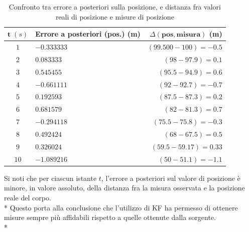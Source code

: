 \begin{table}[h]
	\begin{tabular}{|c|l|r|}
		\hline 
		$\mathbf{t}\;(s)$ & \textbf{Errore a posteriori (pos.) (m)} & $\Delta \mathbf{(pos,misura)}$ \textbf{(m)} \\ 
		\hline 
		$1$ & $-0.333333$ & $(99.500 - 100) =-0.5$ \\ 
		\hline 
		$2$ & $0.083333$ & $(98 - 97.9) = 0.1$ \\ 
		\hline 
		$3$ & $0.545455$ & $(95.5-94.9) = 0.6$ \\ 
		\hline 
		$4$ & $-0.661111$ & $(92 - 92.7) = -0.7$ \\ 
		\hline 
		$5$ &  $0.192593$ & $(87.5 - 87.3) = 0.2$ \\ 
		\hline 
		$6$ & $0.681579$ & $(82 - 81.3) = 0.7$ \\ 
		\hline 
		$7$ & $-0.294118$ & $(75.5 - 75.8) = -0.3$ \\ 
		\hline 
		$8$ & $0.492424$ & $(68 - 67.5) = 0.5$ \\ 
		\hline 
		$9$ & $0.326024$ & $(59.5 - 59.17) = 0.33$ \\ 
		\hline 
		$10$ & $-1.089216$ & $(50-51.1) = -1.1$ \\ 
		\hline 
	\end{tabular} 
	\caption{Confronto tra errore a posteriori sulla posizione, e distanza fra valori reali di posizione e misure di posizione}
	\label{tab:errorsmeas}
\end{table}
Si noti che per ciascun istante $t$, l'errore a posteriori sul valore di posizione \`e minore, in valore assoluto, della distanza fra la misura osservata e la posizione reale del corpo.\\*
Questo porta alla conclusione che l'utilizzo di KF ha permesso di ottenere misure sempre pi\`u affidabili rispetto a quelle ottenute dalla sorgente.\\*